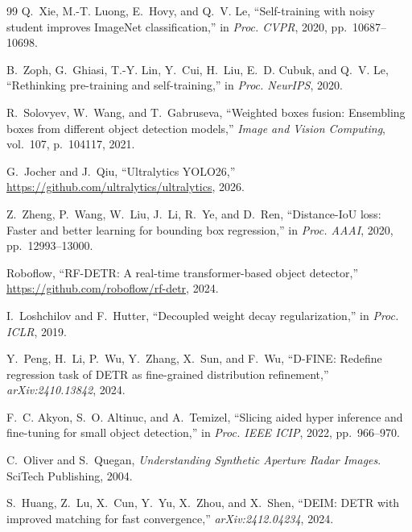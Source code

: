 \documentclass{article}
\begin{document}
\begin{thebibliography}{99}
Q.~Xie, M.-T. Luong, E.~Hovy, and Q.~V. Le,
``Self-training with noisy student improves ImageNet classification,''
in \emph{Proc. CVPR}, 2020, pp.~10687--10698.

B.~Zoph, G.~Ghiasi, T.-Y. Lin, Y.~Cui, H.~Liu, E.~D. Cubuk, and
Q.~V. Le,
``Rethinking pre-training and self-training,''
in \emph{Proc. NeurIPS}, 2020.

R.~Solovyev, W.~Wang, and T.~Gabruseva,
``Weighted boxes fusion: Ensembling boxes from different object
detection models,''
\emph{Image and Vision Computing}, vol.~107, p.~104117, 2021.

G.~Jocher and J.~Qiu,
``Ultralytics YOLO26,''
\url{https://github.com/ultralytics/ultralytics}, 2026.

Z.~Zheng, P.~Wang, W.~Liu, J.~Li, R.~Ye, and D.~Ren,
``Distance-IoU loss: Faster and better learning for bounding box
regression,''
in \emph{Proc. AAAI}, 2020, pp.~12993--13000.

Roboflow,
``RF-DETR: A real-time transformer-based object detector,''
\url{https://github.com/roboflow/rf-detr}, 2024.

I.~Loshchilov and F.~Hutter,
``Decoupled weight decay regularization,''
in \emph{Proc. ICLR}, 2019.

Y.~Peng, H.~Li, P.~Wu, Y.~Zhang, X.~Sun, and F.~Wu,
``D-FINE: Redefine regression task of DETR as fine-grained
distribution refinement,''
\emph{arXiv:2410.13842}, 2024.

F.~C. Akyon, S.~O. Altinuc, and A.~Temizel,
``Slicing aided hyper inference and fine-tuning for small object
detection,''
in \emph{Proc. IEEE ICIP}, 2022, pp.~966--970.

C.~Oliver and S.~Quegan,
\emph{Understanding Synthetic Aperture Radar Images}.
SciTech Publishing, 2004.

S.~Huang, Z.~Lu, X.~Cun, Y.~Yu, X.~Zhou, and X.~Shen,
``DEIM: DETR with improved matching for fast convergence,''
\emph{arXiv:2412.04234}, 2024.

\end{thebibliography}
\end{document}
